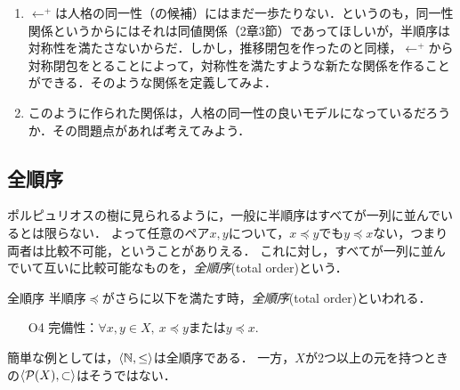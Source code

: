 \documentclass[dvipdfmx,11pt,a4paper]{jsarticle}
\begin{document}
\begin{renshu}{}{}
\begin{enumerate}
 \item $\leftarrow^{+}$は人格の同一性（の候補）にはまだ一歩たりない．というのも，同一性関係というからにはそれは同値関係（2章3節）であってほしいが，半順序は対称性を満たさないからだ．しかし，推移閉包を作ったのと同様，$\leftarrow^{+}$から対称閉包をとることによって，対称性を満たすような新たな関係を作ることができる．そのような関係を定義してみよ．
 \item このように作られた関係は，人格の同一性の良いモデルになっているだろうか．その問題点があれば考えてみよう．
\end{enumerate}
\end{renshu}




\subsection{全順序}
ポルピュリオスの樹に見られるように，一般に半順序はすべてが一列に並んでいるとは限らない．
よって任意のペア$x, y$について，$x \preceq y $でも$y \preceq x$ない，つまり両者は比較不可能，ということがありえる．
これに対し，すべてが一列に並んでいて互いに比較可能なものを，\emph{全順序}(total order)という．


\begin{dfn}{全順序}{}
半順序$\preceq$がさらに以下を満たす時，\emph{全順序}(total order)といわれる．
\begin{itemize}
 \item[O4] 完備性：$\forall x, y \in X, \ x \preceq y$または$y \preceq x$. 
\end{itemize}
\end{dfn}
%
簡単な例としては，$\langle \mathbb{N}, \leq \rangle$は全順序である．
一方，$X$が2つ以上の元を持つときの$\langle \mathcal{P}(X), \subset \rangle$はそうではない．
\end{document}
